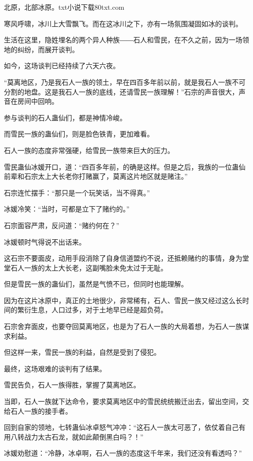 
\begin{this_body}

北原，北部冰原。txt小说下载80txt.com

寒风呼啸，冰川上大雪飘飞。而在这冰川之下，亦有一场氛围凝固如冰的谈判。

生活在这里，隐姓埋名的两个异人种族――石人和雪民，在不久之前，因为一场领地的纠纷，而展开谈判。

如今，这场谈判已经持续了六天六夜。

“莫离地区，乃是我石人一族的领土，早在四百多年前以前，就是我石人一族不可分割的地盘。这是我石人一族的底线，还请雪民一族理解！”石宗的声音很大，声音在房间中回响。

参与谈判的石人蛊仙们，都是神情冷峻。

而雪民一族的蛊仙们，则是脸色铁青，更加难看。

石人一族的态度非常强硬，给雪民一族带来巨大的压力。

雪民蛊仙冰媛开口，道：“四百多年前，的确是这样。但是之后，我族的一位蛊仙前辈和石宗太上大长老你打赌赢了，莫离这片地区就是赌注。”

石宗连忙摆手：“那只是一个玩笑话，当不得真。”

冰媛冷笑：“当时，可都是立下了赌约的。”

石宗面容严肃，反问道：“赌约何在？”

冰媛顿时气得说不出话来。

这石宗不要面皮，动用手段消除了自身信道盟约不说，还抵赖赌约的事情，身为堂堂石人一族的太上大长老，这副嘴脸未免太过于无耻。

但是雪民一族的蛊仙们，虽然是气愤不已，但同时也能理解。

因为在这片冰原中，真正的土地很少，非常稀有，石人、雪民一族又经过这么长时间的繁衍生息，人口过多，对于土地早已经是超负荷。

石宗舍弃面皮，也要夺回莫离地区，也是为了石人一族的大局着想，为石人一族谋求利益。

但这样一来，雪民一族的利益，自然是受到了侵犯。

最终，这场艰难的谈判有了结果。

雪民告负，石人一族得胜，掌握了莫离地区。

当即，石人一族就下达命令，要求莫离地区中的雪民统统搬迁出去，留出空间，交给石人一族的接手者。

回到自家的领地，七转蛊仙冰卓怒气冲冲：“这石人一族太可恶了，依仗着自己有用八转战力太古石龙，就如此颠倒黑白吗？！”

冰媛劝慰道：“冷静，冰卓啊，石人一族的态度这千年来，我们还没有看透吗？”


\end{this_body}
